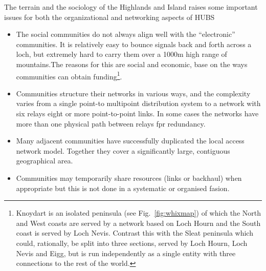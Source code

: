 The terrain and the sociology of the Highlands and Island raises some important issues for both the organizational and networking aspects of HUBS
\begin{itemize} 
\item The social communities do not always align well with the ``electronic'' communities. It is relatively easy to bounce signals back and forth across a loch, but extremely hard to carry them over a 1000m high range of mountains.The reasons for this are social and economic, base on the ways communities can obtain funding\footnote{Knoydart is an isolated peninsula (see Fig.~\ref{fig:whixmap})  of which the North and West coasts are served by a network based on Loch Hourn and the South coast is served by Loch Nevis.  Contrast this with the Sleat peninsula which could, rationally,  be split into three sections, served by Loch Hourn, Loch Nevis and Eigg, but is run independently as a single entity with three connections to the rest of the world.}.
\item Communities structure their networks in various ways, and the complexity varies from a single point-to multipoint distribution system to a network with six relays  eight or more point-to-point links.  In some cases the networks have more than one physical path between relays fpr redundancy.
\item Many adjacent communities have successfully duplicated the local access network model. Together they cover a significantly large, contiguous geographical area. 
\item Communities may temporarily share resources (links or backhaul) when appropriate but this is not done in a systematic or organised fasion.
\end{itemize}
